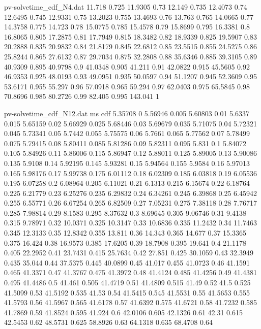\begin{filecontents*}[overwrite]{pv-solvetime_cdf_N4.dat}
11.718 0.725
11.9305 0.73
12.149 0.735
12.4073 0.74
12.6495 0.745
12.9331 0.75
13.2023 0.755
13.4693 0.76
13.763 0.765
14.0665 0.77
14.3758 0.775
14.723 0.78
15.0775 0.785
15.4578 0.79
15.8699 0.795
16.3381 0.8
16.8065 0.805
17.2875 0.81
17.7949 0.815
18.3482 0.82
18.9339 0.825
19.5907 0.83
20.2888 0.835
20.9832 0.84
21.8179 0.845
22.6812 0.85
23.5515 0.855
24.5275 0.86
25.8244 0.865
27.6132 0.87
29.7034 0.875
32.2808 0.88
35.6346 0.885
39.3105 0.89
40.9309 0.895
40.9798 0.9
41.0348 0.905
41.211 0.91
42.0822 0.915
45.5605 0.92
46.9353 0.925
48.0193 0.93
49.0951 0.935
50.0597 0.94
51.1207 0.945
52.3609 0.95
53.6171 0.955
55.297 0.96
57.0918 0.965
59.294 0.97
62.0403 0.975
65.5845 0.98
70.8696 0.985
80.2726 0.99
82.405 0.995
143.041 1
\end{filecontents*}
\begin{filecontents*}[overwrite]{pv-solvetime_cdf_N12.dat}
ms cdf
5.35708 0
5.56946 0.005
5.60803 0.01
5.6337 0.015
5.65159 0.02
5.66929 0.025
5.68446 0.03
5.69679 0.035
5.71075 0.04
5.72321 0.045
5.73341 0.05
5.7442 0.055
5.75575 0.06
5.7661 0.065
5.77562 0.07
5.78499 0.075
5.79415 0.08
5.80411 0.085
5.81286 0.09
5.82311 0.095
5.831 0.1
5.84072 0.105
5.84926 0.11
5.86006 0.115
5.86947 0.12
5.88011 0.125
5.89005 0.13
5.90086 0.135
5.9108 0.14
5.92195 0.145
5.93281 0.15
5.94564 0.155
5.9584 0.16
5.97013 0.165
5.98176 0.17
5.99738 0.175
6.01112 0.18
6.02309 0.185
6.03818 0.19
6.05536 0.195
6.07258 0.2
6.08964 0.205
6.11021 0.21
6.1313 0.215
6.15674 0.22
6.18764 0.225
6.21779 0.23
6.25276 0.235
6.29832 0.24
6.34261 0.245
6.39868 0.25
6.45942 0.255
6.55771 0.26
6.67254 0.265
6.82509 0.27
7.05231 0.275
7.38118 0.28
7.76717 0.285
7.98814 0.29
8.1583 0.295
8.37632 0.3
8.69645 0.305
9.06746 0.31
9.4138 0.315
9.78971 0.32
10.0371 0.325
10.3147 0.33
10.6836 0.335
11.2432 0.34
11.7463 0.345
12.3133 0.35
12.8342 0.355
13.811 0.36
14.343 0.365
14.677 0.37
15.3365 0.375
16.424 0.38
16.9573 0.385
17.6205 0.39
18.7908 0.395
19.641 0.4
21.1178 0.405
22.2952 0.41
23.7431 0.415
25.7634 0.42
27.851 0.425
30.1059 0.43
32.3949 0.435
35.044 0.44
37.5375 0.445
40.0899 0.45
41.017 0.455
41.0723 0.46
41.1591 0.465
41.3371 0.47
41.3767 0.475
41.3972 0.48
41.4124 0.485
41.4256 0.49
41.4381 0.495
41.4486 0.5
41.461 0.505
41.4719 0.51
41.4809 0.515
41.49 0.52
41.5 0.525
41.5099 0.53
41.5192 0.535
41.53 0.54
41.5415 0.545
41.5531 0.55
41.5653 0.555
41.5793 0.56
41.5967 0.565
41.6178 0.57
41.6392 0.575
41.6721 0.58
41.7232 0.585
41.7869 0.59
41.8524 0.595
41.924 0.6
42.0106 0.605
42.1326 0.61
42.31 0.615
42.5453 0.62
48.5731 0.625
58.8926 0.63
64.1318 0.635
68.4708 0.64

\end{filecontents*}
